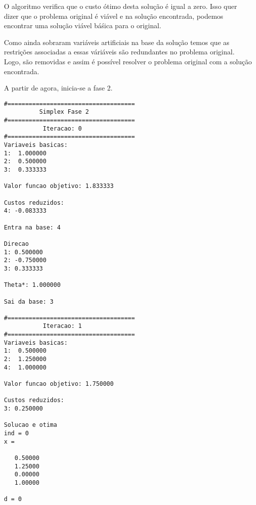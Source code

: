 \documentclass[
	12pt,				%
	openright,			%
	oneside,			%
	a4paper,			%
	english,			%
	french,				%
	spanish,			%
	brazil,				%
	]{abntex2}
\begin{document}
O algoritmo verifica que o custo ótimo desta solução é igual a zero. Isso quer dizer que o problema original é viável e na solução encontrada, podemos encontrar uma solução viável báśica para o original.

Como ainda sobraram variáveis artificiais na base da solução temos que as restrições associadas a essas váriáveis são redundantes no problema original. Logo, são removidas e assim é possível resolver o problema original com a solução encontrada.

A partir de agora, inicia-se a fase 2.


\begin{verbatim}
#====================================
          Simplex Fase 2
#====================================
           Iteracao: 0
#====================================
Variaveis basicas:
1:  1.000000
2:  0.500000
3:  0.333333

Valor funcao objetivo: 1.833333

Custos reduzidos:
4: -0.083333

Entra na base: 4

Direcao
1: 0.500000
2: -0.750000
3: 0.333333

Theta*: 1.000000

Sai da base: 3

#====================================
           Iteracao: 1
#====================================
Variaveis basicas:
1:  0.500000
2:  1.250000
4:  1.000000

Valor funcao objetivo: 1.750000

Custos reduzidos:
3: 0.250000

Solucao e otima 
ind = 0
x =

   0.50000
   1.25000
   0.00000
   1.00000

d = 0
\end{verbatim}
%
%
%
%
\end{document}
